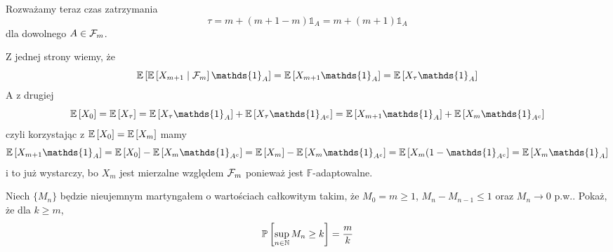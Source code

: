 \begin{solution}
\begin{enumerate}[label=(\alph*)]
      Rozważamy teraz czas zatrzymania
      $$\tau=m+(m+1-m)\mathds{1}_A=m+(m+1)\mathds{1}_A$$
      dla dowolnego $A\in\mathcal{F}_m$.

      Z jednej strony wiemy, że
      $$\expected{\expected{X_{m+1}}{\set{F}_m}\mathds{1}_A}=\expected{X_{m+1}\mathds{1}_A}=\expected{X_\tau\mathds{1}_A}$$
      A z drugiej
      $$\expected{X_0}=\expected{X_\tau}=\expected{X_\tau\mathds{1}_A}+\expected{X_\tau\mathds{1}_{A^c}}=\expected{X_{m+1}\mathds{1}_A}+\expected{X_m\mathds{1}_{A^c}}$$
      czyli korzystając z $\expected{X_0}=\expected{X_m}$ mamy
      $$\expected{X_{m+1}\mathds{1}_A}=\expected{X_0}-\expected{X_m\mathds{1}_{A^c}}=\expected{X_m}-\expected{X_m\mathds{1}_{A^c}}=\expected{X_m(1-\mathds{1}_{A^c}}=\expected{X_m\mathds{1}_A}$$
      i to już wystarczy, bo $X_m$ jest mierzalne względem $\mathcal{F}_m$ ponieważ jest $\mathds{F}$-adaptowalne.
  \end{enumerate}
\end{solution}

\begin{problem}
  Niech $\{M_n\}$ będzie nieujemnym martyngałem o wartościach całkowitym takim, że $M_0=m\geq1$, $M_n-M_{n-1}\leq 1$ oraz $M_n\to 0$ p.w.. Pokaż, że dla $k\geq m$,
  $$\prob{\sup_{n\in\N}M_n\geq k}=\frac{m}{k}$$
\end{problem}

